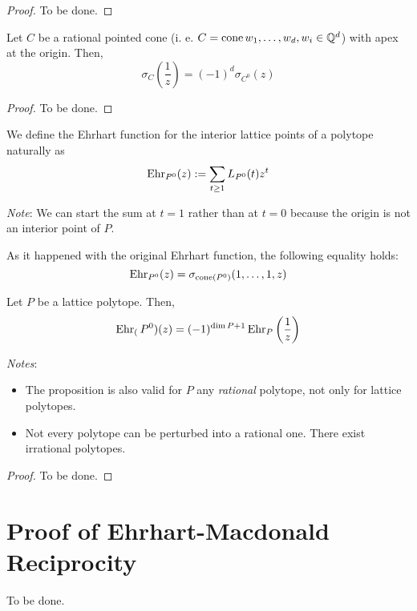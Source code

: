 \begin{proof}
  To be done. %
\end{proof}

\begin{proposition}
  Let $C$ be a rational pointed cone (i. e. $C=\operatorname{cone}{w_1,\ldots,w_d}, w_i\in\mathbb{Q}^d$) with apex at the origin. Then,
  \[
    \sigma_C\left(\frac{1}{z}\right)=(-1)^d\sigma_{C^0}(z)
  \]
\end{proposition}

\begin{proof}
  To be done. %
\end{proof}

\begin{definition}
  We define the Ehrhart function for the interior lattice points of a polytope naturally as
  \[
    \operatorname{Ehr}_{P^0}(z):=\sum_{t\geq 1} L_{P^0}(t)z^t
  \]
\end{definition}

\emph{Note}: We can start the sum at $t=1$ rather than at $t=0$ because the origin is not an interior point of $P$.

\begin{observation}
  As it happened with the original Ehrhart function, the following equality holds:
  \[
    \operatorname{Ehr}_{P^0}(z)=\sigma_{\operatorname{cone}(P^0)}(1,\ldots,1,z)
  \]
\end{observation}

\begin{proposition}
  Let $P$ be a lattice polytope. Then,
  \[
    \operatorname{Ehr}_(P^0)(z)=(-1)^{\dim{P}+1} \operatorname{Ehr}_P\left(\frac{1}{z}\right)
  \]
\end{proposition}

\emph{Notes}:
\begin{itemize}
 \item The proposition is also valid for $P$ any \emph{rational} polytope, not only for lattice polytopes.
 \item Not every polytope can be perturbed into a rational one. There exist irrational polytopes.
\end{itemize}

\begin{proof}
  To be done. %
\end{proof}

\bigskip
\section{Proof of Ehrhart-Macdonald Reciprocity}
To be done. %

